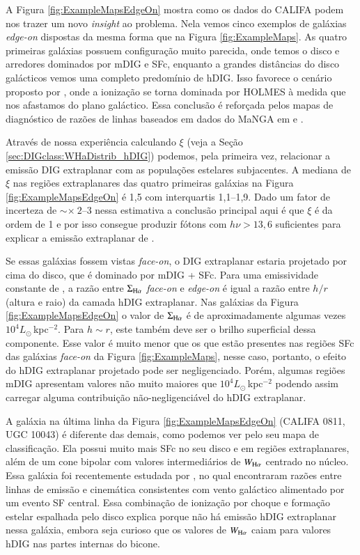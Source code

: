 A Figura \ref{fig:ExampleMapsEdgeOn}  mostra como os dados do CALIFA podem nos trazer um novo {\em insight} ao problema. Nela vemos cinco exemplos de galáxias {\em edge-on} dispostas da mesma forma que na Figura \ref{fig:ExampleMaps}. As quatro primeiras galáxias possuem configuração muito parecida, onde temos o disco e arredores dominados por mDIG e SFc, enquanto a grandes distâncias do disco galácticos vemos uma completo predomínio de hDIG. Isso favorece o cenário proposto por \citet{FloresFajardo.etal.2011a}, onde a ionização se torna dominada por HOLMES à medida que nos afastamos do plano galáctico. Essa conclusão é reforçada pelos mapas de diagnóstico de razões de linhas baseados em dados do MaNGA em \citet{Belfiore.etal.2016} e \citet{Zhang.etal.2017a}.

Através de nossa experiência calculando $\xi$ (veja a Seção \ref{sec:DIGclass:WHaDistrib_hDIG}) podemos, pela primeira vez, relacionar a emissão DIG extraplanar com as populações estelares subjacentes. A mediana de $\xi$ nas regiões extraplanares das quatro primeiras galáxias na Figura \ref{fig:ExampleMapsEdgeOn} é 1,5 com interquartis 1,1--1,9. Dado um fator de incerteza de  $\sim \times ~2$--3 nessa estimativa \citep{CidFernandes.etal.2011a} a conclusão principal aqui é que $\xi$ é da ordem de 1 e por isso consegue produzir fótons com $h\nu > 13,6$ suficientes para explicar a emissão extraplanar de \Ha.

Se essas galáxias fossem vistas {\em face-on}, o DIG extraplanar estaria projetado por cima do disco, que é dominado por mDIG + SFc. Para uma emissividade constante de \Ha, a razão entre $\Sigma_{\Ha}$ {\em face-on} e {\em edge-on} é igual a razão entre $h/r$ (altura e raio) da camada hDIG extraplanar. Nas galáxias da Figura \ref{fig:ExampleMapsEdgeOn} o valor de $\Sigma_{\Ha}$ é de aproximadamente algumas vezes $10^4 L_\odot\,$kpc$^{-2}$. Para $h \sim r$, este também deve ser o brilho superficial dessa componente. Esse valor é muito menor que os que estão presentes nas regiões SFc das galáxias {\em face-on} da Figura \ref{fig:ExampleMaps}, nesse caso, portanto, o efeito do hDIG extraplanar projetado pode ser negligenciado. Porém, algumas regiões mDIG apresentam valores não muito maiores que $10^4 L_\odot\,$kpc$^{-2}$ podendo assim carregar alguma contribuição não-negligenciável do hDIG extraplanar.

A galáxia na última linha da Figura \ref{fig:ExampleMapsEdgeOn} (CALIFA 0811, UGC 10043) é diferente das demais, como podemos ver pelo seu mapa de classificação. Ela possui muito mais SFc no seu disco e em regiões extraplanares, além de um cone bipolar com valores intermediários de $W_{\Ha}$ centrado no núcleo. Essa galáxia foi recentemente estudada por \citet{LopezCoba.etal.2017}, no qual encontraram razões entre linhas de emissão e cinemática consistentes com vento galáctico alimentado por um evento SF central. Essa combinação de ionização por choque e formação estelar espalhada pelo disco explica porque não há emissão hDIG extraplanar nessa galáxia, embora seja curioso que os valores de $W_{\Ha}$ caiam para valores hDIG nas partes internas do bicone.


